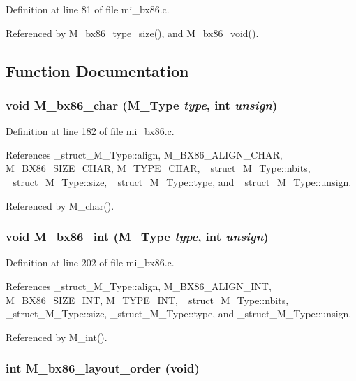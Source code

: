 Definition at line 81 of file mi\_\-bx86.c.

Referenced by M\_\-bx86\_\-type\_\-size(), and M\_\-bx86\_\-void().

\subsection{Function Documentation}
\subsubsection{\setlength{\rightskip}{0pt plus 5cm}void M\_\-bx86\_\-char (\bf{M\_\-Type} {\em type}, int {\em unsign})}\label{mi__bx86_8c_7c70091e0d7c20d8c63151944fd1bb06}




Definition at line 182 of file mi\_\-bx86.c.

References \_\-struct\_\-M\_\-Type::align, M\_\-BX86\_\-ALIGN\_\-CHAR, M\_\-BX86\_\-SIZE\_\-CHAR, M\_\-TYPE\_\-CHAR, \_\-struct\_\-M\_\-Type::nbits, \_\-struct\_\-M\_\-Type::size, \_\-struct\_\-M\_\-Type::type, and \_\-struct\_\-M\_\-Type::unsign.

Referenced by M\_\-char().
\subsubsection{\setlength{\rightskip}{0pt plus 5cm}void M\_\-bx86\_\-int (\bf{M\_\-Type} {\em type}, int {\em unsign})}\label{mi__bx86_8c_bd6ada44fbc29003453b256cfb8df230}




Definition at line 202 of file mi\_\-bx86.c.

References \_\-struct\_\-M\_\-Type::align, M\_\-BX86\_\-ALIGN\_\-INT, M\_\-BX86\_\-SIZE\_\-INT, M\_\-TYPE\_\-INT, \_\-struct\_\-M\_\-Type::nbits, \_\-struct\_\-M\_\-Type::size, \_\-struct\_\-M\_\-Type::type, and \_\-struct\_\-M\_\-Type::unsign.

Referenced by M\_\-int().
\subsubsection{\setlength{\rightskip}{0pt plus 5cm}int M\_\-bx86\_\-layout\_\-order (void)}\label{mi__bx86_8c_ed0ec21bf8df2cde3cbbf6a1794f3971}




